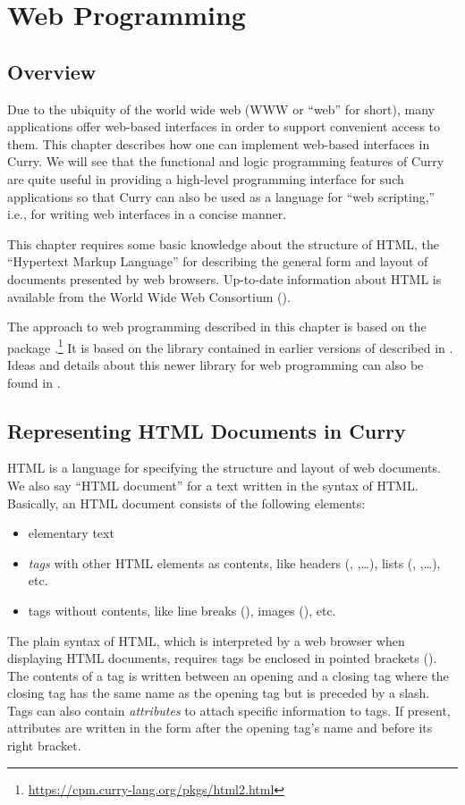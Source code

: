 \chapter{Web Programming}

\section{Overview}

Due to the ubiquity of the world wide web (WWW or ``web'' for short),
many applications offer web-based interfaces in order to support
convenient access to them. This chapter describes how one can
implement web-based interfaces in Curry. We will see that
the functional and logic programming features of Curry
are quite useful in providing a high-level programming interface
for such applications so that Curry can also be used as
a language for ``web scripting,'' i.e., for writing web interfaces
in a concise manner.

This chapter requires some basic knowledge about the structure
of HTML, the ``Hypertext Markup Language'' for describing the
general form and layout of documents presented by web browsers.
Up-to-date information about HTML is available from the
World Wide Web Consortium (\wwwc).

The approach to web programming described in this chapter is based
on the package .\footnote{%
\url{https://cpm.curry-lang.org/pkgs/html2.html}}
It is based on the library  contained
in earlier versions of \pakcs{} described in \cite{Hanus01PADL}.
Ideas and details about this newer library for web programming
can also be found in \cite{Hanus21PADL}.


\section{Representing HTML Documents in Curry}

HTML is a language for specifying the structure and layout of
web documents. We also say ``HTML document'' for a text
written in the syntax of HTML. Basically, an HTML document
consists of the following elements:
\begin{itemize}
\item elementary text
\item \emph{tags} with other HTML elements as contents,
like headers (, ,\ldots),
lists (, ,\ldots), etc.
\item tags without contents, like
line breaks (), images (), etc.
\end{itemize}
The plain syntax of HTML, which is interpreted by a web browser
when displaying HTML documents, requires tags be enclosed in
pointed brackets (\code{<$\cdots$>}).
The contents of a tag is written between an opening and a closing tag
where the closing tag has the same name as the opening tag but is
preceded by a slash.
Tags can also contain \emph{attributes}
to attach specific information to tags. If present, attributes
are written in the form
 after the opening tag's name
and before its right bracket.

